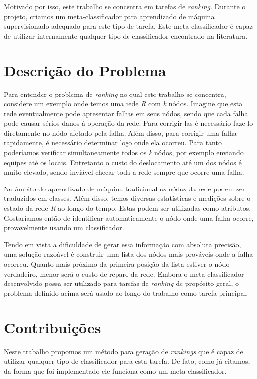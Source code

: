 Motivado por isso, este trabalho se concentra em tarefas de \textit{ranking}.
Durante o projeto, criamos um meta-classificador para aprendizado de máquina supervisionado adequado para este tipo de tarefa.
Este meta-classificador é capaz de utilizar internamente qualquer tipo de classificador encontrado na literatura.

\section{Descrição do Problema}

Para entender o problema de \textit{ranking} no qual este trabalho se concentra, considere um exemplo onde temos uma rede \textit{R} com \textit{k} nódos.
Imagine que esta rede eventualmente pode apresentar falhas em seus nódos, sendo que cada falha pode causar sérios danos à operação da rede.
Para corrigir-las é necessário faze-lo diretamente no nódo afetado pela falha.
Além disso, para corrigir uma falha rapidamente, é necessário determinar logo onde ela ocorreu.
Para tanto poderíamos verificar simultaneamente todos os \textit{k} nódos, por exemplo enviando equipes até os locais.
Entretanto o custo do deslocamento até um dos nódos é muito elevado, sendo inviável checar toda a rede sempre que ocorre uma falha.

No âmbito do aprendizado de máquina tradicional os nódos da rede podem ser traduzidos em classes.
Além disso, temos diversas estatísticas e medições sobre o estado da rede \textit{R} ao longo do tempo.
Estas podem ser utilizadas como atributos.
Gostaríamos então de identificar automaticamente o nódo onde uma falha ocorre, provavelmente usando um classificador.

Tendo em vista a dificuldade de gerar essa informação com absoluta precisão, uma solução razoável é construir uma lista dos nódos mais prováveis onde a falha ocorreu.
Quanto mais próximo da primeira posição da lista estiver o nódo verdadeiro, menor será o custo de reparo da rede.
Embora o meta-classificador desenvolvido possa ser utilizado para tarefas de \textit{ranking} de propósito geral, o problema definido acima será usado ao longo do trabalho como tarefa principal.

\section{Contribuições}

Neste trabalho propomos um método para geração de \textit{rankings} que é capaz de utilizar qualquer tipo de classificador para esta tarefa.
De fato, como já citamos, da forma que foi implementado ele funciona como um meta-classificador.

